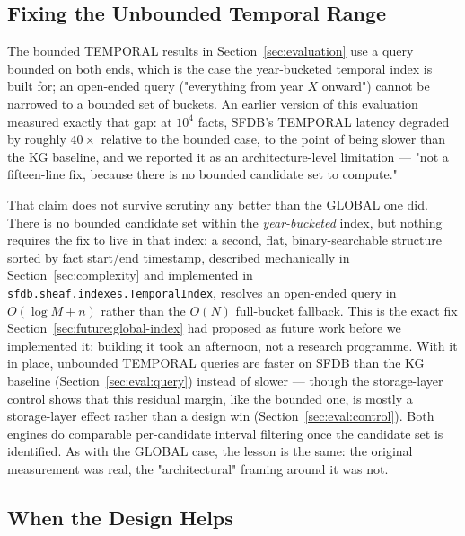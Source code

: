 \subsection{Fixing the Unbounded Temporal Range}
\label{sec:discussion:temporal-unbounded}

The bounded TEMPORAL results in Section~\ref{sec:evaluation} use a query
bounded on both ends, which is the case the year-bucketed temporal index
is built for; an open-ended query ("everything from year $X$ onward")
cannot be narrowed to a bounded set of buckets. An earlier version of this
evaluation measured exactly that gap: at $10^4$ facts, SFDB's TEMPORAL
latency degraded by roughly $40\times$ relative to the bounded case, to
the point of being slower than the KG baseline, and we reported it as an
architecture-level limitation --- "not a fifteen-line fix, because there
is no bounded candidate set to compute."

That claim does not survive scrutiny any better than the GLOBAL one did.
There is no bounded candidate set within the \emph{year-bucketed} index,
but nothing requires the fix to live in that index: a second, flat,
binary-searchable structure sorted by fact start/end timestamp, described
mechanically in Section~\ref{sec:complexity} and implemented in
\texttt{sfdb.sheaf.indexes.TemporalIndex}, resolves an open-ended query in
$O(\log M + n)$ rather than the $O(N)$ full-bucket fallback. This is the
exact fix Section~\ref{sec:future:global-index} had proposed as future
work before we implemented it; building it took an afternoon, not a
research programme. With it in place, unbounded TEMPORAL queries are
\rangetemporalunbkg{} faster on SFDB than the KG baseline
(Section~\ref{sec:eval:query}) instead of slower --- though the
storage-layer control shows that this residual margin, like the bounded
one, is mostly a storage-layer effect rather than a design win
(Section~\ref{sec:eval:control}). Both engines do comparable
per-candidate interval filtering once the candidate set is identified.
As with the GLOBAL case, the lesson is the
same: the original measurement was real, the "architectural" framing
around it was not.

\subsection{When the Design Helps}
\label{sec:discussion:sheaf-wins}

